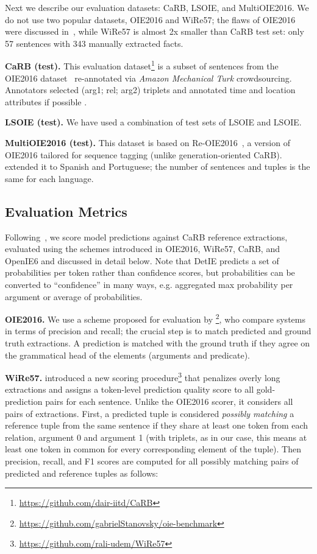 \documentclass[letterpaper]{article} \usepackage{aaai22}  \usepackage{times}  \usepackage{helvet}  \usepackage{courier}  \usepackage[hyphens]{url}  \usepackage{graphicx} \usepackage{placeins}
\begin{document}
Next we describe our evaluation datasets: CaRB, LSOIE, and MultiOIE2016. We do not use two popular datasets, OIE2016 and WiRe57; the flaws of OIE2016 were discussed in~\cite{zhan2020span,bhardwaj-etal-2019-carb}, while WiRe57 is almost 2x smaller than CaRB test set: only 57 sentences with 343 manually extracted facts.


\textbf{CaRB (test).} This evaluation dataset\footnote{\url{https://github.com/dair-iitd/CaRB}} is a subset of sentences from the OIE2016 dataset~\cite{Stanovsky2016EMNLP} re-annotated via \emph{Amazon Mechanical Turk} crowdsourcing.  Annotators selected (arg1; rel; arg2) triplets and annotated time and location attributes if possible
\cite{bhardwaj-etal-2019-carb}.

\textbf{LSOIE (test).} We have used a combination of test sets of LSOIE and LSOIE.

\textbf{MultiOIE2016 (test).} This dataset is based on Re-OIE2016~\cite{zhan2020span}, a version of OIE2016 tailored for sequence tagging (unlike generation-oriented CaRB). \citet{ro2020multi} extended it to Spanish and Portuguese;
the number of sentences and tuples is the same for each language.

\subsection{Evaluation Metrics}\label{ssec:eval_data}

Following~\citet{kolluru2020openie6}, we score model predictions 
against CaRB reference extractions,
evaluated using the schemes introduced in OIE2016, WiRe57, CaRB, and OpenIE6 and discussed in detail below.
Note that DetIE predicts a set of probabilities per token rather than confidence scores, but probabilities can be converted to ``confidence'' in many ways, e.g. aggregated max probability per argument or average  of probabilities.

\textbf{OIE2016.}
We use a scheme proposed for evaluation by \citet{Stanovsky2016EMNLP}\footnote{\url{https://github.com/gabrielStanovsky/oie-benchmark}}, who compare systems in terms of precision and recall; the crucial step is to match predicted and ground truth extractions. A prediction is matched with the ground truth if they agree on the grammatical head of the elements (arguments and predicate).  

\textbf{WiRe57.} \citet{lechelle2019wire57} introduced a new scoring procedure\footnote{\url{https://github.com/rali-udem/WiRe57}}
that penalizes overly long extractions and assigns a token-level prediction quality score to all gold-prediction pairs for each sentence. Unlike the OIE2016 scorer, it considers all pairs of extractions.
First, a predicted tuple is considered \textit{possibly matching} a reference tuple from the same sentence if they share at least one token from each relation, argument 0 and argument 1 (with triplets, as in our case, this means at least one token in common for every corresponding element of the tuple). Then precision, recall, and F1 scores are computed for all possibly matching pairs of predicted  and reference  tuples as follows:
\end{document}
